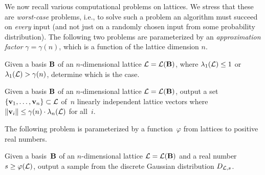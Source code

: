 We now recall various computational problems on lattices. We stress
that these are \emph{worst-case} problems, i.e., to solve such a
problem an algorithm must succeed on \emph{every} input (and not just on a randomly chosen input from some probability distribution). The following
two problems are parameterized by an \emph{approximation factor}
$\gamma = \gamma(n)$, which is a function of the lattice dimension $n$.

\begin{definition}%
  \label{def:GapSVP}
  Given a basis $\mathbf{B}$ of an $n$-dimensional lattice
  $\mathcal{L} = \mathcal{L}(\mathbf{B})$, where $\lambda_1(\mathcal{L}) \leq 1$ or
  $\lambda_1(\mathcal{L}) > \gamma(n)$, determine which is the case.
\end{definition}

\begin{definition}%
  \label{def:SIVP}
  Given a basis $\mathbf{B}$ of an $n$-dimensional lattice
  $\mathcal{L} = \mathcal{L}(\mathbf{B})$, output a set
  $\{ \mathbf{v}_{1}, \ldots, \mathbf{v}_{n} \} \subset \mathcal{L}$ of~$n$ linearly
  independent lattice vectors where
  $\lVert \mathbf{v}_i \rVert \leq \gamma(n) \cdot \lambda_n(\mathcal{L})$ for all~$i$.
\end{definition}

The following problem is parameterized by a function~$\varphi$ from
lattices to positive real numbers.

\begin{definition}%
  \label{def:DGS}
  Given a basis~$\mathbf{B}$ of an $n$-dimensional lattice $\mathcal{L} =
  \mathcal{L}(\mathbf{B})$ and a real number $s \geq \varphi(\mathcal{L})$, output a sample
  from the discrete Gaussian distribution $D_{\mathcal{L},s}$.
\end{definition}

